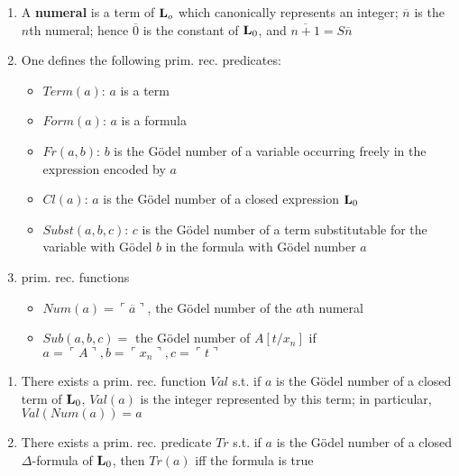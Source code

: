 \documentclass[11pt]{article}
\begin{document}
\begin{definition}[]
\begin{enumerate}
\item A \textbf{numeral} is a term of \(\operatorname{\textbf{L}}_o\) which canonically represents an integer;
\(\overline{n}\) is the \(n\)th numeral; hence \(\overline{0}\) is the constant
of \(\operatorname{\textbf{L}}_0\), and \(\overline{n+1}=S\overline{n}\)
\item One defines the following prim. rec. predicates:
\begin{itemize}
\item \(Term(a)\): \(a\) is a term
\item \(Form(a)\): \(a\) is a formula
\item \(Fr(a,b)\): \(b\) is the Gödel number of a variable occurring freely in the
expression encoded by \(a\)
\item \(Cl(a)\): \(a\) is the Gödel number of a closed expression \(\operatorname{\textbf{L}}_0\)
\item \(Subst(a,b,c)\): \(c\) is the Gödel number of a term substitutable for the
variable with Gödel \(b\) in the formula with Gödel number \(a\)
\end{itemize}
\item prim. rec. functions
\begin{itemize}
\item \(Num(a)=\ulcorner\overline{a}\urcorner\), the Gödel number of the \(a\)th
numeral
\item \(Sub(a,b,c)=\) the Gödel number of \(A[t/x_n]\) if \(a=\ulcorner
     A\urcorner,b=\ulcorner x_n\urcorner,c=\ulcorner t\urcorner\)
\end{itemize}
\end{enumerate}
\end{definition}


\begin{theorem}[]
\begin{enumerate}
\item There exists a prim. rec. function \(Val\) s.t. if \(a\) is the Gödel number of a
closed term of \(\operatorname{\textbf{L}}_0\), \(Val(a)\) is the integer represented by this term; in
particular, \(Val(Num(a))=a\)
\item There exists a prim. rec. predicate \(Tr\) s.t. if \(a\) is the Gödel number of a
closed \(\Delta\)-formula of \(\operatorname{\textbf{L}}_0\), then \(Tr(a)\) iff the formula is true
\end{enumerate}
\end{theorem}
\end{document}
